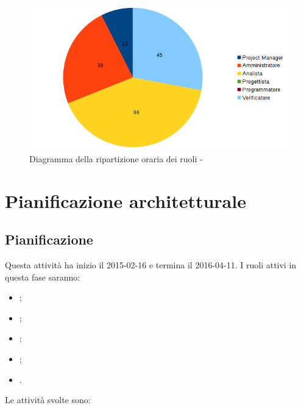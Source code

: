 \documentclass[12pt,a4paper]{article}
\begin{document}
\begin{center}
	\begin{figure}[H]
		\centering
		\includegraphics[width=\textwidth]{diagrammaTortaAnalisiTotaleOre.png}
		\caption{Diagramma della ripartizione oraria dei ruoli - \FA}
	\end{figure}
\end{center}

\newpage

\section{Pianificazione architetturale} %

\subsection{Pianificazione}

Questa attività ha inizio il 2015-02-16 e termina il 2016-04-11.
I ruoli attivi in questa fase saranno:

\begin{itemize}
	\item \PM;
	\item \AM;
	\item \AN;
	\item \PR;
	\item \VR.
\end{itemize}

Le attività svolte sono:
\end{document}
